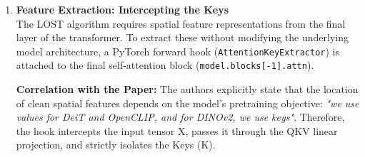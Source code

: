 \documentclass[12pt]{article}
\begin{document}
\begin{enumerate}
    \item \textbf{Feature Extraction: Intercepting the Keys}\\
        The LOST algorithm requires spatial feature representations from the final layer of the transformer. To extract these without modifying the underlying model architecture, a PyTorch forward hook (\texttt{AttentionKeyExtractor}) is attached to the final self-attention block (\texttt{model.blocks[-1].attn}).

        \textbf{Correlation with the Paper:}
        The authors explicitly state that the location of clean spatial features depends on the model's pretraining objective: \textit{"we use values for DeiT and OpenCLIP, and for DINOv2, we use keys"}.
        Therefore, the hook intercepts the input tensor X, passes it through the QKV linear projection, and strictly isolates the Keys (K).
        

\end{enumerate}
\end{document}
